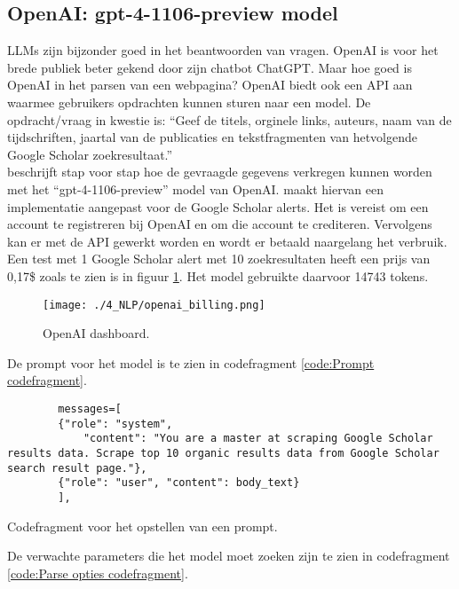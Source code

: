 \subsection{OpenAI: gpt-4-1106-preview model}
LLMs zijn bijzonder goed in het beantwoorden van vragen. OpenAI is voor het brede publiek beter gekend door zijn chatbot ChatGPT. Maar hoe goed is OpenAI in het parsen van een webpagina? OpenAI biedt ook een API aan waarmee gebruikers opdrachten kunnen sturen naar een model. De opdracht/vraag in kwestie is: ``Geef de titels, orginele links, auteurs, naam van de tijdschriften, jaartal van de publicaties en tekstfragmenten van hetvolgende Google Scholar zoekresultaat.''\\
\textcite{Serpapiai2025} beschrijft stap voor stap hoe de gevraagde gegevens verkregen kunnen worden met het ``gpt-4-1106-preview'' model van OpenAI.
\textcite{Depaepeopenai2025} maakt hiervan een implementatie aangepast voor de Google Scholar alerts.
Het is vereist om een account te registreren bij OpenAI en om die account te crediteren. Vervolgens kan er met de API gewerkt worden en wordt er betaald naargelang het verbruik.
Een test met 1 Google Scholar alert met 10 zoekresultaten heeft een prijs van 0,17\$ zoals te zien is in figuur \ref{fig:OpenAI dashboard}. Het model gebruikte daarvoor 14743 tokens. 
\begin{figure}
    \centering
    \texttt{[image: ./4\_NLP/openai\_billing.png]}
    \caption[OpenAI dashboard.]{\label{fig:OpenAI dashboard}OpenAI dashboard.}
\end{figure}
De prompt voor het model is te zien in codefragment \ref{code:Prompt codefragment}.
\begin{listing}
    \begin{verbatim}
        messages=[
        {"role": "system",
            "content": "You are a master at scraping Google Scholar results data. Scrape top 10 organic results data from Google Scholar search result page."},
        {"role": "user", "content": body_text}
        ],
    \end{verbatim}
    \caption[Prompt codefragment]{Codefragment voor het opstellen van een prompt.}
    \label{code:Prompt codefragment}
\end{listing}
De verwachte parameters die het model moet zoeken zijn te zien in codefragment \ref{code:Parse opties codefragment}.
